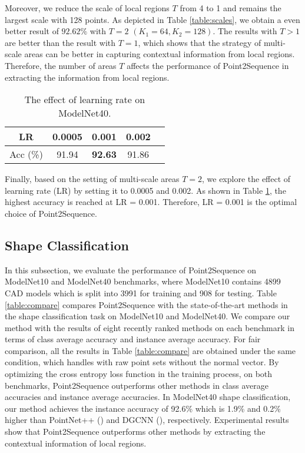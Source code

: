 \documentclass[letterpaper]{article}
\begin{document}
Moreover, we reduce the scale of local regions $T$ from 4 to 1 and remains the largest scale with 128 points.
As depicted in Table \ref{table:scales}, we obtain a even better result of $92.62\%$ with $T=2$ $(K_1=64,K_2=128)$. 
The results with $T > 1$ are better than the result with $T=1$, which shows that the strategy of multi-scale areas can be better in capturing contextual information from local regions.
Therefore, the number of areas $T$ affects the performance of Point2Sequence in extracting the information from local regions.

\begin{table}[!htp]
\centering
\caption{The effect of learning rate on ModelNet40.}
\label{table:lr}
\begin{tabular}{ccccc}\hline
LR&0.0005&0.001&0.002\\ \hline
Acc (\%)&91.94&\textbf{92.63}&91.86\\ \hline
\end{tabular}
\end{table}

Finally, based on the setting of multi-scale areas $T=2$, we explore the effect of learning rate (LR) by setting it to 0.0005 and 0.002.
As shown in Table \ref{table:lr}, the highest accuracy is reached at LR = 0.001.
Therefore, LR = 0.001 is the optimal choice of Point2Sequence.

\subsection{Shape Classification}
In this subsection, we evaluate the performance of Point2Sequence on ModelNet10 and ModelNet40 benchmarks, where
ModelNet10 contains 4899 CAD models which is split into 3991 for training and 908 for testing.
Table \ref{table:compare} compares Point2Sequence with the state-of-the-art methods in the shape classification task on ModelNet10 and ModelNet40.
We compare our method with the results of eight recently ranked methods on each benchmark in terms of class average accuracy and instance average accuracy.
For fair comparison, all the results in Table \ref{table:compare}  are obtained under the same condition, which handles with raw point sets without the normal vector.
By optimizing the cross entropy loss function in the training process, on both benchmarks, Point2Sequence outperforms other methods in class average accuracies and instance average accuracies.
In ModelNet40 shape classification, our method achieves the instance accuracy of 92.6\% which is 1.9\% and 0.2\% higher than PointNet++ (\citealt{qi2017pointnet++}) and DGCNN (\citealt{wang2018dynamic}), respectively.
Experimental results show that Point2Sequence outperforms other methods by extracting the contextual information of local regions.
\end{document}
